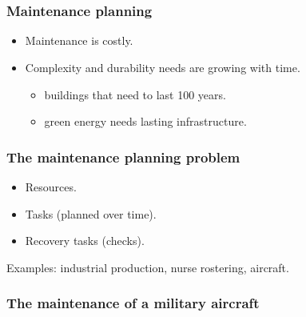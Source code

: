 \section{\introtitle}

\begin{frame}
\frametitle{\textbf{Maintenance planning}}

  \begin{itemize}[<+->]
  \item
    Maintenance is costly.
  \item
    Complexity and durability needs are growing with time.

    \begin{itemize}[<+->]
    
    \item
      buildings that need to last 100 years.
    \item
      green energy needs lasting infrastructure.
    \end{itemize}
  \end{itemize}
\end{frame}

\begin{frame}
\frametitle{\textbf{The maintenance planning problem}}

  \pause

  \begin{itemize}[<+->]

  \item Resources.
  \item Tasks (planned over time).
  \item Recovery tasks (checks).
  \end{itemize}
  
  \pause
  Examples: industrial production, nurse rostering, aircraft.
\end{frame}

\begin{frame}
\frametitle{\textbf{The maintenance of a military aircraft}}
  \begin{tikzpicture}
    
  \end{tikzpicture}
\end{frame}

